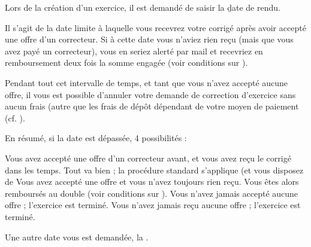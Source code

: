 Lors de la création d'un exercice, il est demandé de saisir la \b{date de rendu}.

Il s'agit de la date limite à laquelle vous recevrez votre corrigé après avoir accepté une offre d'un correcteur.
Si à cette date vous n'aviez rien reçu (mais que vous avez payé un correcteur), vous en seriez alerté par mail et recevriez en remboursement deux fois la somme engagée (voir conditions sur ).

Pendant tout cet intervalle de temps, et tant que vous n'avez accepté aucune offre, il vous est possible d'annuler votre demande de correction d'exercice sans aucun frais (autre que les frais de dépôt dépendant de votre moyen de paiement (cf. ).

En résumé, si la date est dépassée, 4 possibilités :
\begin{enumerate}
\li Vous avez accepté une offre d'un correcteur avant, et vous avez reçu le corrigé dans les temps. Tout va bien ; la procédure standard s'applique (et vous disposez de %
\li Vous avez accepté une offre et vous n'avez toujours rien reçu. Vous êtes alors remboursés au double  (voir conditions sur ).
\li Vous n'avez jamais accepté aucune offre ; l'exercice est terminé.
\li Vous n'avez jamais reçu aucune offre ; l'exercice est terminé.
\end{enumerate}

Une autre date vous est demandée, la .